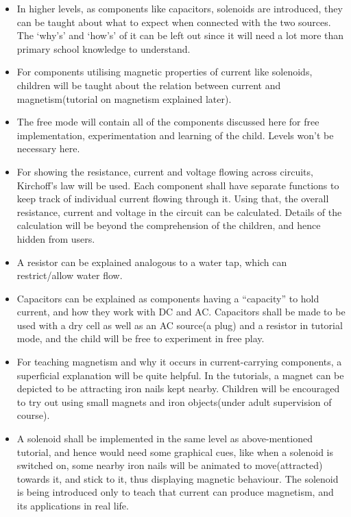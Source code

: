 \documentclass[preprint,12pt]{elsarticle}
\begin{document}
\begin{itemize}
\begin{itemize}
\begin{itemize}
					\item {In higher levels, as components like capacitors, solenoids are introduced, they can be taught about what to expect when connected with the two sources. The ‘why’s’ and ‘how’s’ of it can be left out since it will need a lot more than primary school knowledge to understand.}
					
					\item {For components utilising magnetic properties of current like solenoids, children will be taught about the relation between current and magnetism(tutorial on magnetism explained later).}
					
					\item {The free mode will contain all of the components discussed here for free implementation, experimentation and learning of the child. Levels won’t be necessary here.}
					
					\item {For showing the resistance, current and voltage flowing across circuits, Kirchoff’s law will be used. Each component shall have separate functions to keep track of individual current flowing through it. Using that, the overall resistance, current and voltage in the circuit can be calculated. Details of the calculation will be beyond the comprehension of the children, and hence hidden from users.}

					\item {A resistor can be explained analogous to a water tap, which can  restrict/allow water flow.}
					
					\item {Capacitors can be explained as components having a “capacity” to hold current, and how they work with DC and AC. Capacitors shall be made to be used with a dry cell as well as an AC source(a plug) and a resistor in tutorial mode, and the child will be free to experiment in free play.}
					
					\item {For teaching magnetism and why it occurs in current-carrying components, a superficial explanation will be quite helpful. In the tutorials, a magnet can be depicted to be attracting iron nails kept nearby. Children will be encouraged to try out using small magnets and iron objects(under adult supervision of course).}
					
					\item {A solenoid shall be implemented in the same level as above-mentioned tutorial, and hence would need some graphical cues, like when a solenoid is switched on, some nearby iron nails will be animated to move(attracted) towards it, and stick to it, thus displaying magnetic behaviour. The solenoid is being introduced only to teach that current can produce magnetism, and its applications in real life.}					
					

\end{itemize}
\end{itemize}
\end{itemize}
\end{document}

